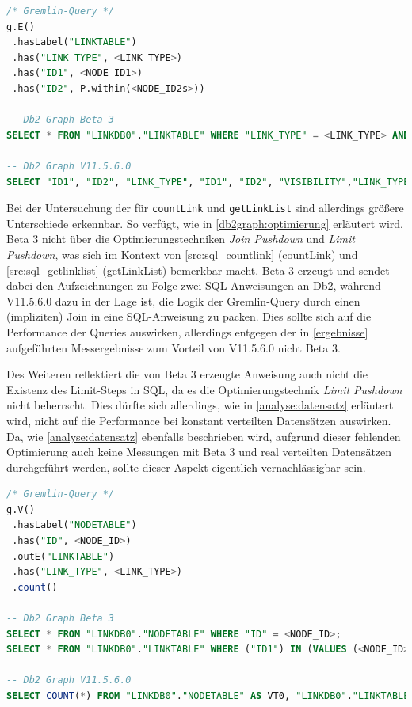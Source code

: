 \begin{lstlisting}[caption={Generierter SQL-Code getLink},label=src:sql_getlink,language=SQL]
/* Gremlin-Query */
g.E()
 .hasLabel("LINKTABLE")
 .has("LINK_TYPE", <LINK_TYPE>)
 .has("ID1", <NODE_ID1>)
 .has("ID2", P.within(<NODE_ID2s>))

-- Db2 Graph Beta 3
SELECT * FROM "LINKDB0"."LINKTABLE" WHERE "LINK_TYPE" = <LINK_TYPE> AND "ID1" = <NODE_ID1> AND "ID2" IN (VALUES <NODE_ID2_0>, <NODE_ID2_1>, <...>);

-- Db2 Graph V11.5.6.0
SELECT "ID1", "ID2", "LINK_TYPE", "ID1", "ID2", "VISIBILITY","LINK_TYPE", "DATA", "ID2", "ID1", "VERSION", "TIME" FROM "LINKDB0"."LINKTABLE" WHERE "LINK_TYPE" = <LINK_TYPE> AND "ID1" = <NODE_ID1> AND "ID2" IN (VALUES <NODE_ID2_0>, <NODE_ID2_1>, <...>);
\end{lstlisting}

Bei der Untersuchung der für \texttt{countLink} und \texttt{getLinkList} sind allerdings größere Unterschiede erkennbar. So verfügt, wie in \autoref{db2graph:optimierung} erläutert wird, Beta 3 nicht über die Optimierungstechniken \textit{Join Pushdown} und \textit{Limit Pushdown}, was sich im Kontext von \autoref{src:sql_countlink} (countLink) und \autoref{src:sql_getlinklist} (getLinkList) bemerkbar macht. Beta 3 erzeugt und sendet dabei den Aufzeichnungen zu Folge zwei SQL-Anweisungen an Db2, während V11.5.6.0 dazu in der Lage ist, die Logik der Gremlin-Query durch einen (impliziten) Join in eine SQL-Anweisung zu packen. Dies sollte sich auf die Performance der Queries auswirken, allerdings entgegen der in \autoref{ergebnisse} aufgeführten Messergebnisse zum Vorteil von V11.5.6.0 nicht Beta 3. 

Des Weiteren reflektiert die von Beta 3 erzeugte Anweisung auch nicht die Existenz des Limit-Steps in SQL, da es die Optimierungstechnik \textit{Limit Pushdown} nicht beherrscht. Dies dürfte sich allerdings, wie in \autoref{analyse:datensatz} erläutert wird, nicht auf die Performance bei konstant verteilten Datensätzen auswirken. Da, wie \autoref{analyse:datensatz} ebenfalls beschrieben wird, aufgrund dieser fehlenden Optimierung auch keine Messungen mit Beta 3 und real verteilten Datensätzen durchgeführt werden, sollte dieser Aspekt eigentlich vernachlässigbar sein. 
\begin{lstlisting}[caption={Generierter SQL-Code countLink},label=src:sql_countlink,language=SQL]
/* Gremlin-Query */
g.V()
 .hasLabel("NODETABLE")
 .has("ID", <NODE_ID>)
 .outE("LINKTABLE")
 .has("LINK_TYPE", <LINK_TYPE>)
 .count()

-- Db2 Graph Beta 3
SELECT * FROM "LINKDB0"."NODETABLE" WHERE "ID" = <NODE_ID>;
SELECT * FROM "LINKDB0"."LINKTABLE" WHERE ("ID1") IN (VALUES (<NODE_ID>)) AND "LINK_TYPE" = <LINK_TYPE>;

-- Db2 Graph V11.5.6.0
SELECT COUNT(*) FROM "LINKDB0"."NODETABLE" AS VT0, "LINKDB0"."LINKTABLE" AS ET1 WHERE VT0."ID" = <NODE_ID> AND ET1."LINK_TYPE" = <LINK_TYPE> AND VT0.ID = ET1.ID1
\end{lstlisting}

